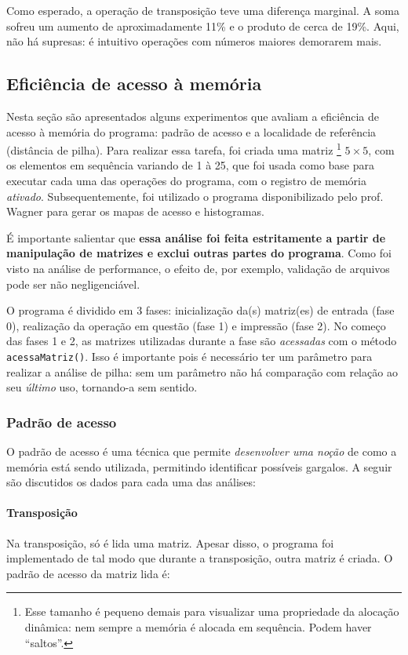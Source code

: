 \documentclass{article}
\def\code#1{\texttt{#1}}
\begin{document}
Como esperado, a operação de transposição teve uma diferença marginal. A soma sofreu um aumento de aproximadamente 11\% e o produto de cerca de 19\%. Aqui, não há supresas: é intuitivo operações com números maiores demorarem mais.

\subsection{Eficiência de acesso à memória}

Nesta seção são apresentados alguns experimentos que avaliam a eficiência de acesso à memória do programa: padrão de acesso e a localidade de referência (distância de pilha). Para realizar essa tarefa, foi criada uma matriz \footnote{Esse tamanho é pequeno demais para visualizar uma propriedade da alocação dinâmica: nem sempre a memória é alocada em sequência. Podem haver ``saltos''.} \( 5 \times 5 \), com os elementos em sequência variando de 1 à 25, que foi usada como base para executar cada uma das operações do programa, com o registro de memória \textit{ativado}. Subsequentemente, foi utilizado o programa disponibilizado pelo prof. Wagner para gerar os mapas de acesso e histogramas.

É importante salientar que \textbf{essa análise foi feita estritamente a partir de manipulação de matrizes e exclui outras partes do programa}. Como foi visto na análise de performance, o efeito de, por exemplo, validação de arquivos pode ser não negligenciável.

O programa é dividido em 3 fases: inicialização da(s) matriz(es) de entrada (fase 0), realização da operação em questão (fase 1) e impressão (fase 2). No começo das fases 1 e 2, as matrizes utilizadas durante a fase são \textit{acessadas} com o método \code{acessaMatriz()}. Isso é importante pois é necessário ter um parâmetro para realizar a análise de pilha: sem um parâmetro não há comparação com relação ao seu \textit{último} uso, tornando-a sem sentido.

\subsubsection{Padrão de acesso}
O padrão de acesso é uma técnica que permite \textit{desenvolver uma noção} de como a memória está sendo utilizada, permitindo identificar possíveis gargalos. A seguir são discutidos os dados para cada uma das análises:

\paragraph{Transposição} Na transposição, só é lida uma matriz. Apesar disso, o programa foi implementado de tal modo que durante a transposição, outra matriz é criada. O padrão de acesso da matriz lida é:
\end{document}
